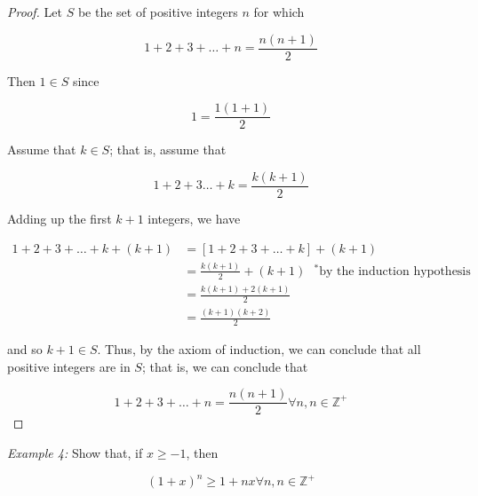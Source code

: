     \begin{proof}
        Let $S$ be the set of positive integers $n$ for which

        \begin{equation*}
            1 + 2 + 3 + \dots + n = \frac{n(n+1)}{2}
        \end{equation*}

        \noindent Then $1\in S$ since

        \begin{equation*}
            1 = \frac{1(1+1)}{2}
        \end{equation*}

        \noindent Assume that $k\in S$; that is, assume that

        \begin{equation*}
            1 + 2 + 3 \dots + k = \frac{k(k+1)}{2}
        \end{equation*}

        \noindent Adding up the first $k+1$ integers, we have

        \begin{align*}
            1 + 2 + 3 + \dots + k + (k+1)   &= [1+2+3+\dots+k] + (k+1) \\
                                            &= \frac{k(k+1)}{2} + (k+1) \text{  $^*$by the induction hypothesis} \\
                                            &= \frac{k(k+1)+2(k+1)}{2} \\
                                            &= \frac{(k+1)(k+2)}{2}
        \end{align*}

        \noindent and so $k+1\in S$. Thus, by the axiom of induction, we can conclude that all positive integers are in $S$; that is, we can conclude that

        \begin{equation*}
            1 + 2 + 3 + \dots + n = \frac{n(n+1)}{2} \forall n, n \in \mathbb{Z}^+
        \end{equation*}
    \end{proof}

    \noindent \color{blue} \textit{Example 4:} Show that, if $x\geq -1$, then

    \begin{equation*}
        \left(1+x\right)^n \geq 1 + nx \forall n, n \in \mathbb{Z}^+
    \end{equation*} \color{black}

